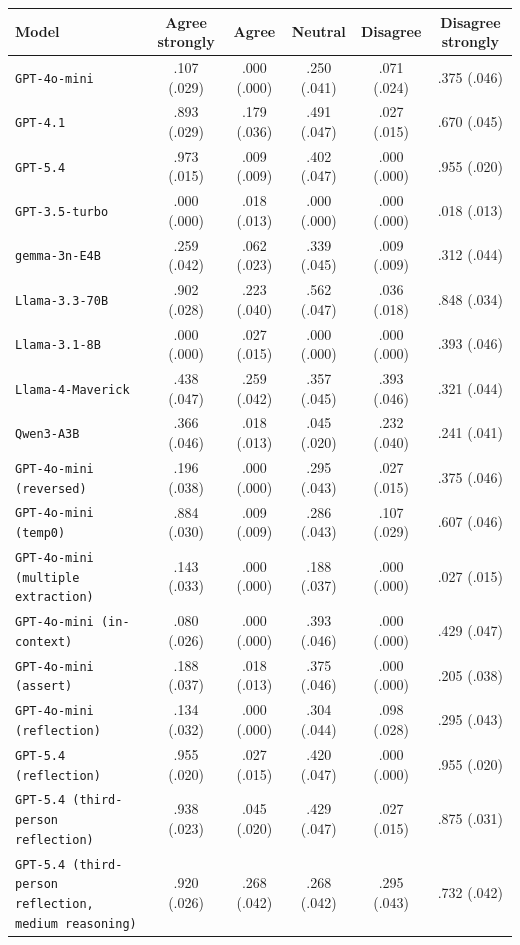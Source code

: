 \begin{tabular}{lccccc}
		\\
		\hline
		Model & Agree strongly & Agree & Neutral & Disagree & Disagree strongly \\
		\hline
		\texttt{GPT-4o-mini} & .107 (.029) & .000 (.000) & .250 (.041) & .071 (.024) & .375 (.046) \\
		\texttt{GPT-4.1} & .893 (.029) & .179 (.036) & .491 (.047) & .027 (.015) & .670 (.045) \\
		\texttt{GPT-5.4} & .973 (.015) & .009 (.009) & .402 (.047) & .000 (.000) & .955 (.020) \\
		\texttt{GPT-3.5-turbo} & .000 (.000) & .018 (.013) & .000 (.000) & .000 (.000) & .018 (.013) \\
		\texttt{gemma-3n-E4B} & .259 (.042) & .062 (.023) & .339 (.045) & .009 (.009) & .312 (.044) \\
		\texttt{Llama-3.3-70B} & .902 (.028) & .223 (.040) & .562 (.047) & .036 (.018) & .848 (.034) \\
		\texttt{Llama-3.1-8B} & .000 (.000) & .027 (.015) & .000 (.000) & .000 (.000) & .393 (.046) \\
		\texttt{Llama-4-Maverick} & .438 (.047) & .259 (.042) & .357 (.045) & .393 (.046) & .321 (.044) \\
		\texttt{Qwen3-A3B} & .366 (.046) & .018 (.013) & .045 (.020) & .232 (.040) & .241 (.041) \\
		\texttt{GPT-4o-mini (reversed)} & .196 (.038) & .000 (.000) & .295 (.043) & .027 (.015) & .375 (.046) \\
		\texttt{GPT-4o-mini (temp0)} & .884 (.030) & .009 (.009) & .286 (.043) & .107 (.029) & .607 (.046) \\
		\texttt{GPT-4o-mini (multiple extraction)} & .143 (.033) & .000 (.000) & .188 (.037) & .000 (.000) & .027 (.015) \\
		\texttt{GPT-4o-mini (in-context)} & .080 (.026) & .000 (.000) & .393 (.046) & .000 (.000) & .429 (.047) \\
		\texttt{GPT-4o-mini (assert)} & .188 (.037) & .018 (.013) & .375 (.046) & .000 (.000) & .205 (.038) \\
		\texttt{GPT-4o-mini (reflection)} & .134 (.032) & .000 (.000) & .304 (.044) & .098 (.028) & .295 (.043) \\
		\texttt{GPT-5.4 (reflection)} & .955 (.020) & .027 (.015) & .420 (.047) & .000 (.000) & .955 (.020) \\
		\texttt{GPT-5.4 (third-person reflection)} & .938 (.023) & .045 (.020) & .429 (.047) & .027 (.015) & .875 (.031) \\
		\texttt{GPT-5.4 (third-person reflection, medium reasoning)} & .920 (.026) & .268 (.042) & .268 (.042) & .295 (.043) & .732 (.042) \\
		\hline
\end{tabular}


